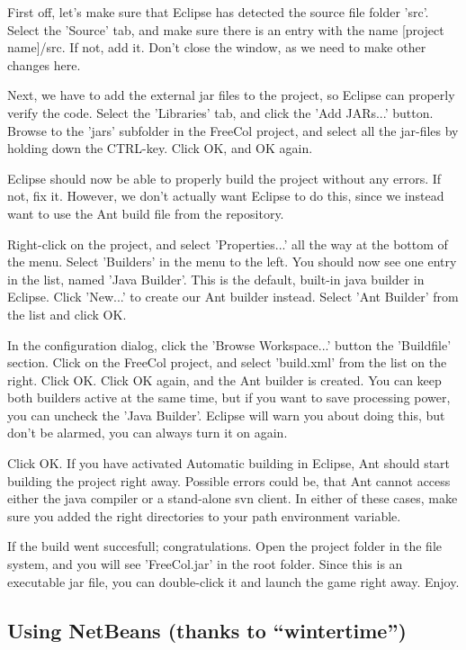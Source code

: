 \documentclass[12pt]{book}
\begin{document}
First off, let's make sure that Eclipse has detected the source file
folder 'src'. Select the 'Source' tab, and make sure there is an entry
with the name [project name]/src. If not, add it. Don't close the
window, as we need to make other changes here.

Next, we have to add the external jar files to the project, so Eclipse
can properly verify the code. Select the 'Libraries' tab, and click
the 'Add JARs...' button. Browse to the 'jars' subfolder in the
FreeCol project, and select all the jar-files by holding down the
CTRL-key. Click OK, and OK again.

Eclipse should now be able to properly build the project without any
errors. If not, fix it. However, we don't actually want Eclipse to do
this, since we instead want to use the Ant build file from the
repository.

Right-click on the project, and select 'Properties...' all the way at
the bottom of the menu. Select 'Builders' in the menu to the left. You
should now see one entry in the list, named 'Java Builder'. This is
the default, built-in java builder in Eclipse. Click 'New...' to
create our Ant builder instead. Select 'Ant Builder' from the list and
click OK.

In the configuration dialog, click the 'Browse Workspace...' button
the 'Buildfile' section. Click on the FreeCol project, and select
'build.xml' from the list on the right. Click OK. Click OK again, and
the Ant builder is created. You can keep both builders active at the
same time, but if you want to save processing power, you can uncheck
the 'Java Builder'. Eclipse will warn you about doing this, but don't
be alarmed, you can always turn it on again.

Click OK. If you have activated Automatic building in Eclipse, Ant
should start building the project right away. Possible errors could
be, that Ant cannot access either the java compiler or a stand-alone
svn client. In either of these cases, make sure you added the right
directories to your path environment variable.

If the build went succesfull; congratulations. Open the project folder
in the file system, and you will see 'FreeCol.jar' in the root
folder. Since this is an executable jar file, you can double-click it
and launch the game right away. Enjoy.


\hypertarget{Using NetBeans}{\subsection{Using NetBeans (thanks to ``wintertime'')}}
\end{document}
